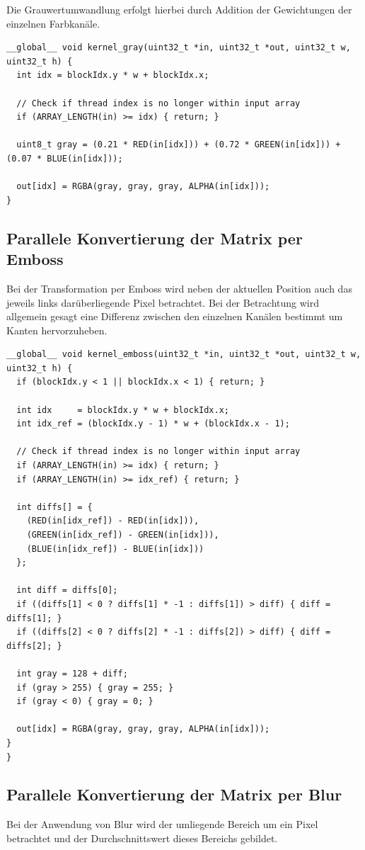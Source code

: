 \documentclass{llncs}
\begin{document}
Die Grauwertumwandlung erfolgt hierbei durch Addition der Gewichtungen der einzelnen Farbkanäle. 

\begin{lstlisting}
__global__ void kernel_gray(uint32_t *in, uint32_t *out, uint32_t w, uint32_t h) {
  int idx = blockIdx.y * w + blockIdx.x;

  // Check if thread index is no longer within input array
  if (ARRAY_LENGTH(in) >= idx) { return; }

  uint8_t gray = (0.21 * RED(in[idx])) + (0.72 * GREEN(in[idx])) + (0.07 * BLUE(in[idx]));

  out[idx] = RGBA(gray, gray, gray, ALPHA(in[idx]));
}
\end{lstlisting}

%
\subsection{Parallele Konvertierung der Matrix per Emboss}
%

Bei der Transformation per Emboss wird neben der aktuellen Position auch das jeweils links darüberliegende Pixel betrachtet. Bei der Betrachtung wird allgemein gesagt eine Differenz zwischen den einzelnen Kanälen bestimmt um Kanten hervorzuheben.

\begin{lstlisting}
__global__ void kernel_emboss(uint32_t *in, uint32_t *out, uint32_t w, uint32_t h) {
  if (blockIdx.y < 1 || blockIdx.x < 1) { return; }

  int idx     = blockIdx.y * w + blockIdx.x;
  int idx_ref = (blockIdx.y - 1) * w + (blockIdx.x - 1);

  // Check if thread index is no longer within input array
  if (ARRAY_LENGTH(in) >= idx) { return; }
  if (ARRAY_LENGTH(in) >= idx_ref) { return; }

  int diffs[] = {
    (RED(in[idx_ref]) - RED(in[idx])),
    (GREEN(in[idx_ref]) - GREEN(in[idx])),
    (BLUE(in[idx_ref]) - BLUE(in[idx]))
  };

  int diff = diffs[0];
  if ((diffs[1] < 0 ? diffs[1] * -1 : diffs[1]) > diff) { diff = diffs[1]; }
  if ((diffs[2] < 0 ? diffs[2] * -1 : diffs[2]) > diff) { diff = diffs[2]; }

  int gray = 128 + diff;
  if (gray > 255) { gray = 255; }
  if (gray < 0) { gray = 0; }

  out[idx] = RGBA(gray, gray, gray, ALPHA(in[idx]));
}
}
\end{lstlisting}
%
\subsection{Parallele Konvertierung der Matrix per Blur}
%
Bei der Anwendung von Blur wird der umliegende Bereich um ein Pixel betrachtet und der Durchschnittswert dieses Bereichs gebildet.
\end{document}
